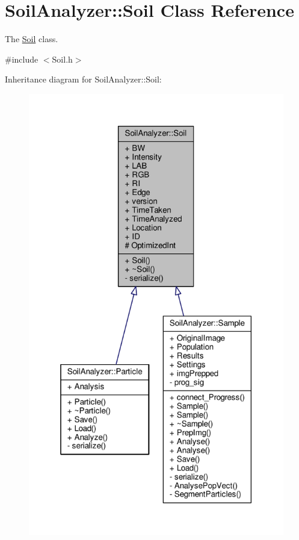 \hypertarget{class_soil_analyzer_1_1_soil}{}\section{Soil\+Analyzer\+:\+:Soil Class Reference}
\label{class_soil_analyzer_1_1_soil}


The \hyperlink{class_soil_analyzer_1_1_soil}{Soil} class.  




{\ttfamily \#include $<$Soil.\+h$>$}



Inheritance diagram for Soil\+Analyzer\+:\+:Soil\+:\nopagebreak
\begin{figure}[H]
\begin{center}
\leavevmode
\includegraphics[height=550pt]{class_soil_analyzer_1_1_soil__inherit__graph}
\end{center}
\end{figure}


